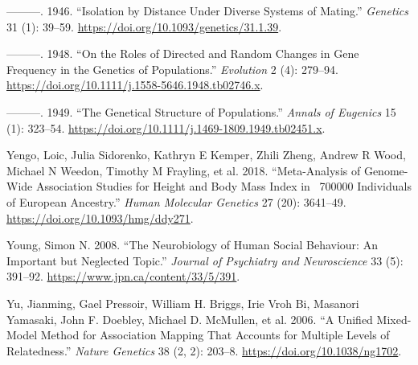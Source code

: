 \documentclass[
]{book}
\newlength{\cslhangindent}
\newlength{\cslentryspacingunit} %
\newenvironment{CSLReferences}[2] %
 {%
  \setlength{\parindent}{0pt}
  \ifodd #1
  \let\oldpar\par
  \def\par{\hangindent=\cslhangindent\oldpar}
  \fi
  \setlength{\parskip}{#2\cslentryspacingunit}
 }%
 {}
\begin{document}
\begin{CSLReferences}{1}{0}
\leavevmode{}%
---------. 1946. {``Isolation by {Distance} Under {Diverse Systems} of {Mating}.''} \emph{Genetics} 31 (1): 39--59. \url{https://doi.org/10.1093/genetics/31.1.39}.

\leavevmode{}%
---------. 1948. {``On the {Roles} of {Directed} and {Random Changes} in {Gene Frequency} in the {Genetics} of {Populations}.''} \emph{Evolution} 2 (4): 279--94. \url{https://doi.org/10.1111/j.1558-5646.1948.tb02746.x}.

\leavevmode{}%
---------. 1949. {``The {Genetical Structure} of {Populations}.''} \emph{Annals of Eugenics} 15 (1): 323--54. \url{https://doi.org/10.1111/j.1469-1809.1949.tb02451.x}.

\leavevmode{}%
Yengo, Loic, Julia Sidorenko, Kathryn E Kemper, Zhili Zheng, Andrew R Wood, Michael N Weedon, Timothy M Frayling, et al. 2018. {``Meta-Analysis of Genome-Wide Association Studies for Height and Body Mass Index in ~700000 Individuals of {European} Ancestry.''} \emph{Human Molecular Genetics} 27 (20): 3641--49. \url{https://doi.org/10.1093/hmg/ddy271}.

\leavevmode{}%
Young, Simon N. 2008. {``The Neurobiology of Human Social Behaviour: An Important but Neglected Topic.''} \emph{Journal of Psychiatry and Neuroscience} 33 (5): 391--92. \url{https://www.jpn.ca/content/33/5/391}.

\leavevmode{}%
Yu, Jianming, Gael Pressoir, William H. Briggs, Irie Vroh Bi, Masanori Yamasaki, John F. Doebley, Michael D. McMullen, et al. 2006. {``A Unified Mixed-Model Method for Association Mapping That Accounts for Multiple Levels of Relatedness.''} \emph{Nature Genetics} 38 (2, 2): 203--8. \url{https://doi.org/10.1038/ng1702}.

\end{CSLReferences}
\end{document}
